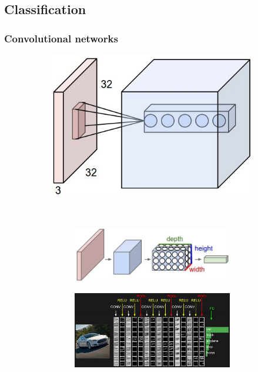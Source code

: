 \documentclass{beamer}
\begin{document}
	\subsection[Classification]{Classification}
	\begin{frame}
		\vspace{30pt}
		\frametitle{Convolutional networks}
		\begin{figure}[h]
			\centering
			\begin{subfigure}{0.4\textwidth}
				\includegraphics[width=\textwidth]{plots/convLayer.jpeg}
			\end{subfigure}
			~
			\begin{subfigure}{0.5\textwidth}
				\begin{subfigure}{\textwidth}
					\includegraphics[width=\textwidth]{plots/convNetVolumes.jpeg}
				\end{subfigure}
				\par \smallskip
				\begin{subfigure}{\textwidth}
					\includegraphics[width=\textwidth]{plots/convNetExample.jpeg}

\end{subfigure}
\end{subfigure}
\end{figure}
\end{frame}
\end{document}

